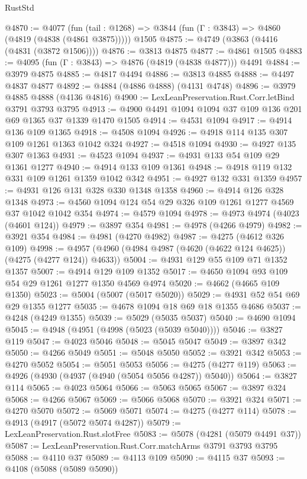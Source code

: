 \begin{lexlean}{RustStd}
\begin{coremodule}
{\begin{coremodule}
{{{{{{{{{{{{{{{{{{{{{{{{{{{{{{{{{{{@4870 := @4077
    (fun (tail : @1268) => @3844 (fun (Γ : @3843) => @4860 (@4819 (@4838 (@4861 @3875)))))
    @1505
@4875 := @4749 (@3863 (@4416 (@4831 (@3872 @1506))))
@4876 := @3813 @4875
@4877 := @4861 @1505
@4883 := @4095 (fun (Γ : @3843) => @4876 (@4819 (@4838 @4877))) @4491
@4884 := @3979 @4875
@4885 := @4817 @4494
@4886 := @3813 @4885
@4888 := @4497 @4837 @4877
@4892 := @4884 (@4886 @4888) (@4131 @4748)
@4896 := @3979 @4885 @4888 (@4136 @4816)
@4900 := LexLeanPreservation.Rust.Corr.letBind @3791 @3793 @3795
@4913 := @4900 @4491 @1094 @1094 @37 @109 @136 @201 @69 @1365 @37 @1339 @1470 @1505
@4914 := @4531 @1094
@4917 := @4914 @136 @109 @1365
@4918 := @4508 @1094
@4926 := @4918 @114 @135 @307 @109 @1261 @1363 @1042 @324
@4927 := @4518 @1094
@4930 := @4927 @135 @307 @1363
@4931 := @4523 @1094
@4937 := @4931 @133 @54 @109 @29 @1361 @1277
@4940 := @4914 @133 @109 @1361
@4948 := @4918 @119 @132 @331 @109 @1261 @1359 @1042 @342
@4951 := @4927 @132 @331 @1359
@4957 := @4931 @126 @131 @328 @330 @1348 @1358
@4960 := @4914 @126 @328 @1348
@4973 := @4560 @1094 @124 @54 @29 @326 @109 @1261 @1277 @4569 @37 @1042 @1042 @354
@4974 := @4579 @1094
@4978 := @4973 @4974 (@4023 (@4601 @124))
@4979 := @3897 @354
@4981 := @4978 (@4266 @4979)
@4982 := @3921 @354
@4984 := @4981 (@4270 @4982)
@4987 := @4275 (@4612 @326 @109)
@4998 := @4957 (@4960 (@4984 @4987 (@4620 (@4622 @124 @4625)) (@4275 (@4277 @124)) @4633))
@5004 := @4931 @129 @55 @109 @71 @1352 @1357
@5007 := @4914 @129 @109 @1352
@5017 := @4650 @1094 @93 @109 @54 @29 @1261 @1277 @1350 @4569 @4974
@5020 := @4662 (@4665 @109 @1350)
@5023 := @5004 (@5007 (@5017 @5020))
@5029 := @4931 @52 @54 @69 @29 @1355 @1277
@5035 := @4678 @1094 @18 @69 @18 @1355 @4686
@5037 := @4248 (@4249 @1355)
@5039 := @5029 (@5035 @5037)
@5040 := @4690 @1094
@5045 := @4948 (@4951 (@4998 (@5023 (@5039 @5040))))
@5046 := @3827 @119
@5047 := @4023 @5046
@5048 := @5045 @5047
@5049 := @3897 @342
@5050 := @4266 @5049
@5051 := @5048 @5050
@5052 := @3921 @342
@5053 := @4270 @5052
@5054 := @5051 @5053
@5056 := @4275 (@4277 @119)
@5063 := @4926 (@4930 (@4937 (@4940 (@5054 @5056 @4287)) @5040))
@5064 := @3827 @114
@5065 := @4023 @5064
@5066 := @5063 @5065
@5067 := @3897 @324
@5068 := @4266 @5067
@5069 := @5066 @5068
@5070 := @3921 @324
@5071 := @4270 @5070
@5072 := @5069 @5071
@5074 := @4275 (@4277 @114)
@5078 := @4913 (@4917 (@5072 @5074 @4287))
@5079 := LexLeanPreservation.Rust.slotFree
@5083 := @5078 (@4281 (@5079 @4491 @37))
@5087 := LexLeanPreservation.Rust.Corr.matchArms @3791 @3793 @3795
@5088 := @4110 @37
@5089 := @4113 @109
@5090 := @4115 @37
@5093 := @4108 (@5088 (@5089 @5090))
}}}}}}}}}}}}}}}}}}}}}}}}}}}}}}}}}}}
\end{coremodule}}
\end{coremodule}
\end{lexlean}
